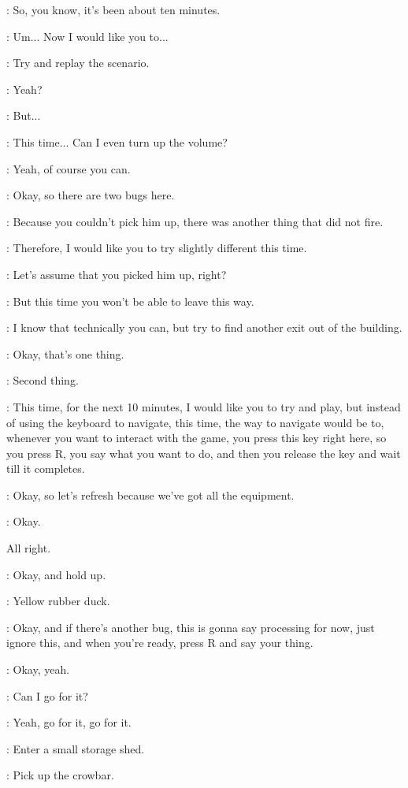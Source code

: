 \Gabriel: So, you know, it's been about ten minutes.

\Gabriel: Um... Now I would like you to...

\Gabriel: Try and replay the scenario.

\Gabriel: Yeah?

\Gabriel: But...

\Kacper: This time... Can I even turn up the volume?

\Kacper: Yeah, of course you can.

\Gabriel: Okay, so there are two bugs here.

\Gabriel: Because you couldn't pick him up, there was another thing that did not fire.

\Gabriel: Therefore, I would like you to try slightly different this time.

\Gabriel: Let's assume that you picked him up, right?

\Gabriel: But this time you won't be able to leave this way.

\Gabriel: I know that technically you can, but try to find another exit out of the building.

\Gabriel: Okay, that's one thing.

\Gabriel: Second thing.

\Gabriel: This time, for the next 10 minutes, I would like you to try and play, but instead of using the keyboard to navigate, this time, the way to navigate would be to, whenever you want to interact with the game, you press this key right here, so you press R, you say what you want to do, and then you release the key and wait till it completes.

\Gabriel: Okay, so let's refresh because we've got all the equipment.

\Kacper: Okay.

All right.

\Gabriel: Okay, and hold up.

\Gabriel: Yellow rubber duck.

\Gabriel: Okay, and if there's another bug, this is gonna say processing for now, just ignore this, and when you're ready, press R and say your thing.

\Gabriel: Okay, yeah.

\Gabriel: Can I go for it?

\Gabriel: Yeah, go for it, go for it.

\Kacper: Enter a small storage shed.

\Kacper: Pick up the crowbar.

